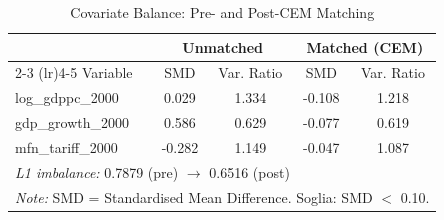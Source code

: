 \begin{table}[htbp]
\centering
\caption{Covariate Balance: Pre- and Post-CEM Matching}
\label{tab:cem_balance}
\small
\begin{tabular}{lcccc}
\hline\hline
& \multicolumn{2}{c}{Unmatched} & \multicolumn{2}{c}{Matched (CEM)} \\
\cmidrule(lr){2-3} \cmidrule(lr){4-5}
Variable & SMD & Var. Ratio & SMD & Var. Ratio \\
\hline
log_gdppc_2000 & 0.029 & 1.334 & -0.108 & 1.218 \\
gdp_growth_2000 & 0.586 & 0.629 & -0.077 & 0.619 \\
mfn_tariff_2000 & -0.282 & 1.149 & -0.047 & 1.087 \\
\hline
\multicolumn{5}{l}{\footnotesize \textit{L1 imbalance:} 0.7879 (pre) $\rightarrow$ 0.6516 (post)} \\
\multicolumn{5}{l}{\footnotesize \textit{Note:} SMD = Standardised Mean Difference. Soglia: SMD $<$ 0.10.} \\
\end{tabular}
\end{table}
